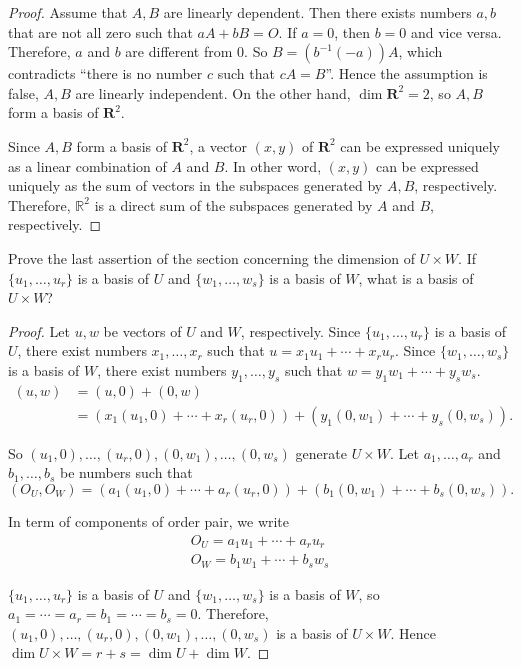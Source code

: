 \begin{proof}
    Assume that $A, B$ are linearly dependent. Then there exists numbers $a, b$ that are not all zero such that $aA + bB = O$. If $a = 0$, then $b = 0$ and vice versa. Therefore, $a$ and $b$ are different from $0$. So $B = (b^{-1}(-a))A$, which contradicts ``there is no number $c$ such that $cA = B$''. Hence the assumption is false, $A, B$ are linearly independent. On the other hand, $\dim\mathbf{R}^{2} = 2$, so $A, B$ form a basis of $\mathbf{R}^{2}$.

    Since $A, B$ form a basis of $\mathbf{R}^{2}$, a vector $(x, y)$ of $\mathbf{R}^{2}$ can be expressed uniquely as a linear combination of $A$ and $B$. In other word, $(x, y)$ can be expressed uniquely as the sum of vectors in the subspaces generated by $A, B$, respectively. Therefore, $\mathbb{R}^{2}$ is a direct sum of the subspaces generated by $A$ and $B$, respectively.
\end{proof}

\begin{exercise}
    Prove the last assertion of the section concerning the dimension of $U\times W$. If $\{ u_{1}, \ldots, u_{r} \}$ is a basis of $U$ and $\{ w_{1}, \ldots, w_{s} \}$ is a basis of $W$, what is a basis of $U\times W$?
\end{exercise}

\begin{proof}
    Let $u, w$ be vectors of $U$ and $W$, respectively. Since $\{ u_{1}, \ldots, u_{r} \}$ is a basis of $U$, there exist numbers $x_{1}, \ldots, x_{r}$ such that $u = x_{1}u_{1} + \cdots + x_{r}u_{r}$. Since $\{ w_{1}, \ldots, w_{s} \}$ is a basis of $W$, there exist numbers $y_{1}, \ldots, y_{s}$ such that $w = y_{1}w_{1} + \cdots + y_{s}w_{s}$.
    \begin{align*}
        (u, w) & = (u, 0) + (0, w)                                                                                                    \\
               & = \left(x_{1}(u_{1}, 0) + \cdots + x_{r}(u_{r}, 0)\right) + \left(y_{1}(0, w_{1}) + \cdots + y_{s}(0, w_{s})\right).
    \end{align*}

    So $(u_{1}, 0), \ldots, (u_{r}, 0), (0, w_{1}), \ldots, (0, w_{s})$ generate $U\times W$. Let $a_{1}, \ldots, a_{r}$ and $b_{1}, \ldots, b_{s}$ be numbers such that
    \[
        (O_{U}, O_{W}) = \left(a_{1}(u_{1}, 0) + \cdots + a_{r}(u_{r}, 0)\right) + \left(b_{1}(0, w_{1}) + \cdots + b_{s}(0, w_{s})\right).
    \]

    In term of components of order pair, we write
    \[
        \begin{split}
            O_{U} = a_{1}u_{1} + \cdots + a_{r}u_{r} \\
            O_{W} = b_{1}w_{1} + \cdots + b_{s}w_{s}
        \end{split}
    \]


    $\{ u_{1}, \ldots, u_{r} \}$ is a basis of $U$ and $\{ w_{1}, \ldots, w_{s} \}$ is a basis of $W$, so $a_{1} = \cdots = a_{r} = b_{1} = \cdots = b_{s} = 0$. Therefore, $(u_{1}, 0), \ldots, (u_{r}, 0), (0, w_{1}), \ldots, (0, w_{s})$ is a basis of $U\times W$. Hence $\dim U\times W = r + s = \dim U + \dim W$.
\end{proof}
